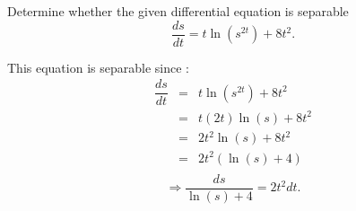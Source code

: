 \documentclass[11pt]{article}
\begin{document}
\begin{problem}
Determine whether the given differential equation is separable
\begin{equation}
     \dfrac{ ds }{dt}  =  t \ln(s^{2t}) + 8 t^2.
\end{equation}
\end{problem}

\begin{solution}
This equation is separable since : 
\begin{eqnarray*}
\dfrac{ ds }{dt}  & = &  t \ln(s^{2t}) + 8 t^2 \\
& = & t(2t)\ln(s) + 8 t^2 \\
& = & 2t^2\ln(s) + 8 t^2 \\
& = & 2t^2(\ln(s) + 4 ) \\
\end{eqnarray*}
\begin{equation*}
\Rightarrow \boxed{ \dfrac{ ds }{\ln(s) + 4 } = 2t^2 dt}.
\end{equation*}
\end{solution}




% 
\end{document}
